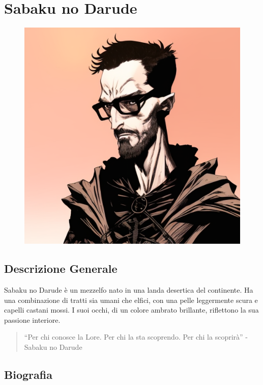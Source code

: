\section{Sabaku no Darude}\label{sabaku-no-darude}


\begin{figure}
\centering
\includegraphics{blkmndy_fantasy_character_with_a_hooded_cape_with_a_beard_with_glasses.png}
\end{figure}

\subsection{Descrizione Generale}\label{descrizione-generale}



Sabaku no Darude è un mezzelfo nato in una landa desertica del
continente. Ha una combinazione di tratti sia umani che elfici, con una
pelle leggermente scura e capelli castani mossi. I suoi occhi, di un
colore ambrato brillante, riflettono la sua passione interiore.

\begin{quote}
``Per chi conosce la Lore. Per chi la sta scoprendo. Per chi la
scoprirà'' - Sabaku no Darude
\end{quote}

\subsection{Biografia}\label{biografia}


